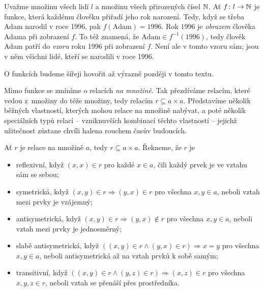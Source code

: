 \begin{example}
  \label{exam:funkce}
  Uvažme množinu všech lidí $l$ a množinu všech přirozených čísel $\mathbb{N}$. Ať
  $f\colon l \to \mathbb{N}$ je funkce, která každému člověku přiřadí jeho rok narození.
  Tedy, když se třeba Adam narodil v roce 1996, pak $f(\text{Adam}) = 1996$. Rok
  $1996$ je \emph{obrazem} člověka Adama při zobrazení $f$. To též znamená, že
  $\text{Adam} \in f^{-1}(1996)$, tedy člověk Adam patří do \emph{vzoru} roku
  1996 při zobrazení $f$. Není ale v tomto vzoru sám; jsou v něm všichni lidé,
  kteří se narodili v roce 1996.
\end{example}
O funkcích budeme šířeji hovořit až výrazně později v tomto textu.

Mimo funkce se zmíníme o relacích \emph{na množině}. Tak přezdíváme relacím,
které vedou z~množiny do téže množiny, tedy relacím $r \subseteq a \times a$.
Představíme několik běžných vlastností, kterých mohou relace na množině nabývat,
a poté několik speciálních typů relací -- vzniknuvších kombinací těchto
vlastností -- jejichž užitečnost zůstane chvíli halena rouchem časův budoucích.

\begin{definition}
  \label{def:vlastnosti-relaci-na-mnozine}
  Ať $r$ je relace na množině $a$, tedy $r \subseteq a \times a$. Řekneme, že
  $r$ je
  \begin{itemize}
    \item \alert{reflexivní}, když $(x, x) \in r$ pro každé $x \in a$, čili
      \alert{každý prvek je ve vztahu sám se sebou};
    \item \alert{symetrická}, když $(x, y) \in r \Rightarrow (y, x) \in r$ pro
      všechna $x, y \in a$, neboli \alert{vztah mezi prvky je vzájemný};
    \item \alert{antisymetrická}, když $(x, y) \in r \Rightarrow (y, x) \notin
      r$ pro všechna $x, y \in a$, neboli \alert{vztah mezi prvky je
      jednosměrný};
    \item \alert{slabě antisymetrická}, když $((x, y) \in r \wedge (y, x) \in
      r) \Rightarrow x = y$ pro všechna $x, y \in a$, neboli
      \alert{antisymetrická až na vztah prvků k sobě samým};
    \item \alert{transitivní}, když $((x, y) \in r \wedge (y, z) \in r)
      \Rightarrow (x, z) \in r$ pro všechna $x, y, z \in r$, neboli \alert{vztah
      se přenáší přes prostředníka}.
  \end{itemize}
\end{definition}


